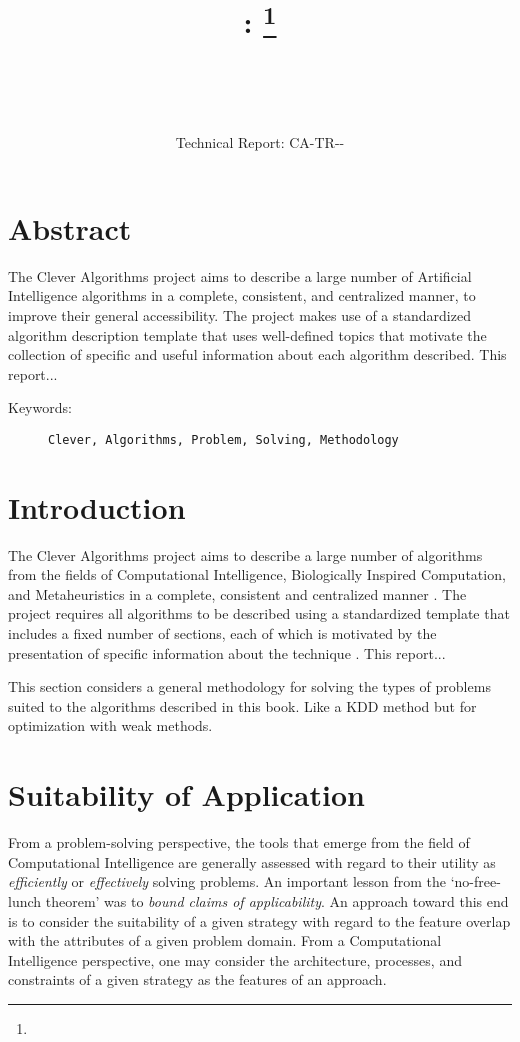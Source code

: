 \documentclass[a4paper, 11pt]{article}
\title{{\myreporttitle}: {\myreportsubtitle}\footnote{\myreportlicense}}
\author{\myreportauthor\\{\myreportemail}\\\small\myreportproject}
\date{\myreportfulldate\\{\small{Technical Report: CA-TR-{\myreportdate}-\myreportversion}}}
\begin{document}
\maketitle

\section*{Abstract} 
The Clever Algorithms project aims to describe a large number of Artificial Intelligence algorithms in a complete, consistent, and centralized manner, to improve their general accessibility. 
The project makes use of a standardized algorithm description template that uses well-defined topics that motivate the collection of specific and useful information about each algorithm described.
This report...

\begin{description}
	\item[Keywords:] {\small\texttt{Clever, Algorithms, Problem, Solving, Methodology}}
\end{description} 

\section{Introduction}
\label{sec:introduction}
The Clever Algorithms project aims to describe a large number of algorithms from the fields of Computational Intelligence, Biologically Inspired Computation, and Metaheuristics in a complete, consistent and centralized manner \cite{Brownlee2010}.
The project requires all algorithms to be described using a standardized template that includes a fixed number of sections, each of which is motivated by the presentation of specific information about the technique \cite{Brownlee2010a}.
This report...

This section considers a general methodology for solving the types of problems suited to the algorithms described in this book. Like a KDD method but for optimization with weak methods.


%
%
\section{Suitability of Application}
From a problem-solving perspective, the tools that emerge from the field of Computational Intelligence are generally assessed with regard to their utility as \emph{efficiently} or \emph{effectively} solving problems.
An important lesson from the `no-free-lunch theorem' was to \emph{bound claims of applicability}. An approach toward this end is to consider the suitability of a given strategy with regard to the feature overlap with the attributes of a given problem domain. From a Computational Intelligence perspective, one may consider the architecture, processes, and constraints of a given strategy as the features of an approach. 
\end{document}
